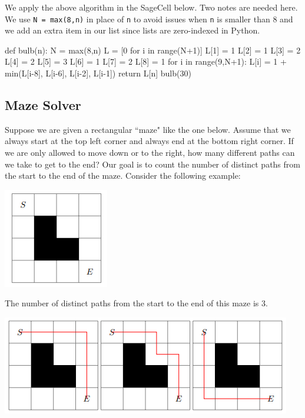 \documentclass{ximera}
\begin{document}
We apply the above algorithm in the SageCell below. Two notes are needed here. We use \verb|N = max(8,n)| in place of \verb|n| to avoid issues when \verb|n| is smaller than 8 and we add an extra item in our list since lists are zero-indexed in Python.

\begin{sageCell}
def bulb(n):
        N = max(8,n)
        L = [0 for i in range(N+1)]
        L[1] = 1
        L[2] = 1
        L[3] = 2
        L[4] = 2
        L[5] = 3
        L[6] = 1
        L[7] = 2
        L[8] = 1
        for i in range(9,N+1):
                L[i] = 1 + min(L[i-8], L[i-6], L[i-2], L[i-1])
        return L[n]
bulb(30)
\end{sageCell}

\subsection{Maze Solver}

Suppose we are given a rectangular ``maze" like the one below. Assume that we always start at the top left corner and always end at the bottom right corner. If we are only allowed to move down or to the right, how many different paths can we take to get to the end? Our goal is to count the number of distinct paths from the start to the end of the maze. Consider the following example:

\begin{center}
\includegraphics{maze_example.png} 
\end{center}

The number of distinct paths from the start to the end of this maze is 3.

\begin{center}
\includegraphics{maze_example_solutions.png}
\end{center}
\end{document}
